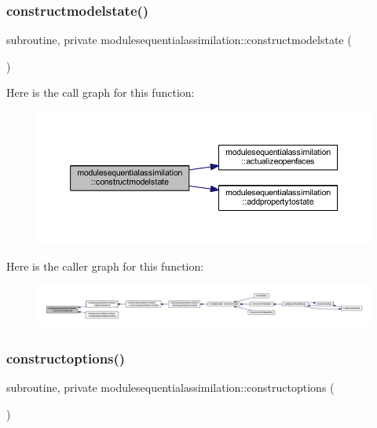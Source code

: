 \subsubsection{\texorpdfstring{constructmodelstate()}{constructmodelstate()}}
{\footnotesize\ttfamily subroutine, private modulesequentialassimilation\+::constructmodelstate (\begin{DoxyParamCaption}{ }\end{DoxyParamCaption})\hspace{0.3cm}{\ttfamily [private]}}

Here is the call graph for this function\+:\nopagebreak
\begin{figure}[H]
\begin{center}
\leavevmode
\includegraphics[width=350pt]{namespacemodulesequentialassimilation_abc672947c709e077d461068b3e7ae140_cgraph}
\end{center}
\end{figure}
Here is the caller graph for this function\+:\nopagebreak
\begin{figure}[H]
\begin{center}
\leavevmode
\includegraphics[width=350pt]{namespacemodulesequentialassimilation_abc672947c709e077d461068b3e7ae140_icgraph}
\end{center}
\end{figure}
\mbox{\label{namespacemodulesequentialassimilation_aab4ab0277115cb693a57157090d95c51}} 
\subsubsection{\texorpdfstring{constructoptions()}{constructoptions()}}
{\footnotesize\ttfamily subroutine, private modulesequentialassimilation\+::constructoptions (\begin{DoxyParamCaption}{ }\end{DoxyParamCaption})\hspace{0.3cm}{\ttfamily [private]}}

